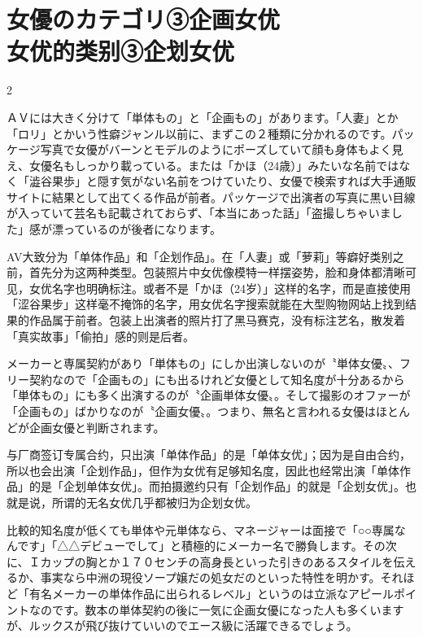 \documentclass[12pt,UTF8]{ctexbook}
\begin{document}
\section{女優のカテゴリ③企画女优\\女优的类别③企划女优}

\begin{paracol}{2}

ＡＶには大きく分けて「単体もの」と「企画もの」があります。「人妻」とか「ロリ」とかいう性癖ジャンル以前に、まずこの２種類に分かれるのです。パッケージ写真で女優がバーンとモデルのようにポーズしていて顔も身体もよく見え、女優名もしっかり載っている。または「かほ（24歳）」みたいな名前ではなく「澁谷果歩」と隠す気がない名前をつけていたり、女優で検索すれば大手通販サイトに結果として出てくる作品が前者。パッケージで出演者の写真に黒い目線が入っていて芸名も記載されておらず、「本当にあった話」「盗撮しちゃいました」感が漂っているのが後者になります。

\switchcolumn

AV大致分为「单体作品」和「企划作品」。在「人妻」或「萝莉」等癖好类别之前，首先分为这两种类型。包装照片中女优像模特一样摆姿势，脸和身体都清晰可见，女优名字也明确标注。或者不是「かほ（24岁）」这样的名字，而是直接使用「涩谷果步」这样毫不掩饰的名字，用女优名字搜索就能在大型购物网站上找到结果的作品属于前者。包装上出演者的照片打了黑马赛克，没有标注艺名，散发着「真实故事」「偷拍」感的则是后者。

\switchcolumn*

メーカーと専属契約があり「単体もの」にしか出演しないのが〝単体女優〟、フリー契約なので「企画もの」にも出るけれど女優として知名度が十分あるから「単体もの」にも多く出演するのが〝企画単体女優〟。そして撮影のオファーが「企画もの」ばかりなのが〝企画女優〟。つまり、無名と言われる女優はほとんどが企画女優と判断されます。

\switchcolumn

与厂商签订专属合约，只出演「单体作品」的是「单体女优」；因为是自由合约，所以也会出演「企划作品」，但作为女优有足够知名度，因此也经常出演「单体作品」的是「企划单体女优」。而拍摄邀约只有「企划作品」的就是「企划女优」。也就是说，所谓的无名女优几乎都被归为企划女优。

\switchcolumn*

比較的知名度が低くても単体や元単体なら、マネージャーは面接で「○○専属なんです」「△△デビューでして」と積極的にメーカー名で勝負します。その次に、Ｉカップの胸とか１７０センチの高身長といった引きのあるスタイルを伝えるか、事実なら中洲の現役ソープ嬢だの処女だのといった特性を明かす。それほど「有名メーカーの単体作品に出られるレベル」というのは立派なアピールポイントなのです。数本の単体契約の後に一気に企画女優になった人も多くいますが、ルックスが飛び抜けていいのでエース級に活躍できるでしょう。


\end{paracol}
\end{document}
